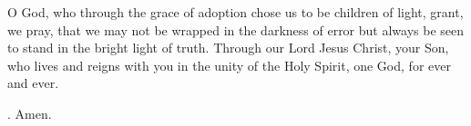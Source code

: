 \lettrine[lines=3]{O}{} God, who through the grace of adoption
chose us to be children of light,
grant, we pray,
that we may not be wrapped in the darkness of error
but always be seen to stand in the bright light of truth.
Through our Lord Jesus Christ, your Son,
who lives and reigns with you in the unity of the Holy Spirit,
one God, for ever and ever. \par \Rbar. Amen.
